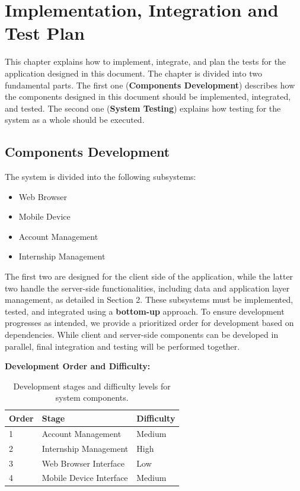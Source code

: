 \documentclass[11pt,twoside]{article}
\begin{document}
\newpage

\section{Implementation, Integration and Test Plan}
This chapter explains how to implement, integrate, and plan the tests for the application designed in this document. The chapter is divided into two fundamental parts. The first one (\textbf{Components Development}) describes how the components designed in this document should be implemented, integrated, and tested. The second one (\textbf{System Testing}) explains how testing for the system as a whole should be executed.

\subsection{Components Development}
The system is divided into the following subsystems:
\begin{itemize}
\item Web Browser
\item Mobile Device
\item Account Management
\item Internship Management
\end{itemize}

The first two are designed for the client side of the application, while the latter two handle the server-side functionalities, including data and application layer management, as detailed in Section 2. These subsystems must be implemented, tested, and integrated using a \textbf{bottom-up} approach. To ensure development progresses as intended, we provide a prioritized order for development based on dependencies. While client and server-side components can be developed in parallel, final integration and testing will be performed together. 

\textbf{Development Order and Difficulty:}

\begin{table}[H]
\centering
\begin{tabular}{|p{}|p{}|p{}|}
\hline
\textbf{Order} & \textbf{Stage} & \textbf{Difficulty} \\
\hline
1 & Account Management & Medium \\
\hline
2 & Internship Management & High \\
\hline
3 & Web Browser Interface & Low \\
\hline
4 & Mobile Device Interface & Medium \\
\hline
\end{tabular}
\caption{Development stages and difficulty levels for system components.}
\end{table}
\end{document}
